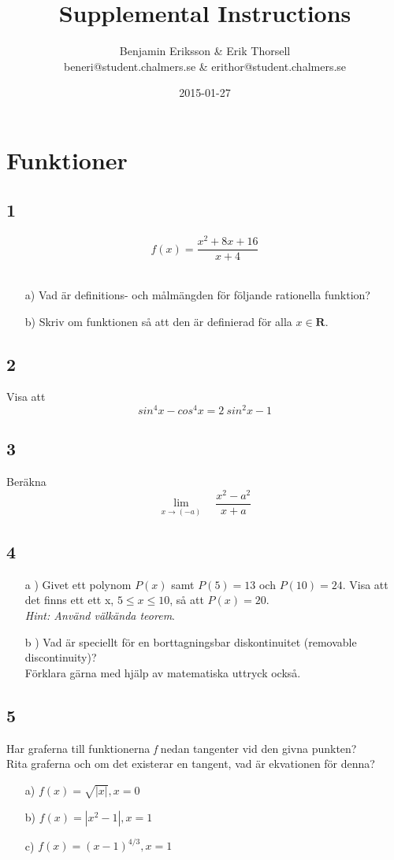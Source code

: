 \documentclass{article}
\title{Supplemental Instructions}
\author{Benjamin Eriksson \& Erik Thorsell \\ 
		\small{beneri@student.chalmers.se} \&
		\small{erithor@student.chalmers.se}
}
\date{
      2015-01-27
     }
\begin{document}
\maketitle

  

\section*{Funktioner}

\subsection*{1}
$$f(x) = \frac{x^2 + 8x + 16}{x+4}$$ \\
\begin{itemize}
\item[a) ] 
Vad är definitions- och målmängden för följande rationella funktion? 
\item[b) ]
Skriv om funktionen så att den är definierad för alla $x \in \mathbf{R}$.
\end{itemize}

\subsection*{2}
Visa att 
$$sin^4 x - cos^4 x = 2 \> sin^2 x - 1$$

\subsection*{3}
Beräkna 
$$\lim_{x \to (-a)} \quad \frac{x^2 - a^2}{x + a}$$

\subsection*{4}
\begin{itemize}
\item[a )]
Givet ett polynom $P(x)$ samt $P(5) = 13$ och $P(10) = 24$. 
Visa att det finns ett ett x, $5 \leq x \leq 10$, så att $P(x) = 20$. \\
\textit{Hint: Använd välkända teorem}. 
\item[b )]
Vad är speciellt för en borttagningsbar diskontinuitet (removable discontinuity)? \\
Förklara gärna med hjälp av matematiska uttryck också.
\end{itemize}

\subsection*{5}
Har graferna till funktionerna {\it f} nedan tangenter vid den givna punkten? \\
Rita graferna och om det existerar en tangent, vad är ekvationen för denna?\\
\begin{itemize}
    \item[a) ]
        $f(x)= \sqrt{|x|}, x = 0$
    \item[b) ]
        $f(x) = |x^2 - 1|, x = 1$
    \item[c) ]
        $f(x) = {(x-1)}^{4/3}, x = 1$
\end{itemize}
\end{document}

